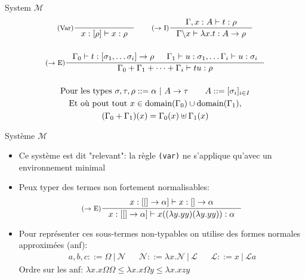 \documentclass{beamer}
\begin{document}
    \begin{frame}
    \begin{block}{System $\mathcal{M}$}
        \begin{gather*}
                \inference[(Var)]{}{x : [\rho] \vdash x : \rho}
                \qquad
                \inference[($\rightarrow$ I)]{\Gamma, x : A \vdash t : \rho}{\Gamma \backslash x \vdash \lambda x.t : A \rightarrow \rho}
                \\ \\
                \inference[($\rightarrow$ E)]{\Gamma_0 \vdash t : [\sigma_1, \ldots \sigma_i] \rightarrow \rho 
                    & \Gamma_1 \vdash u : \sigma_1, \ldots \Gamma_i \vdash u : \sigma_i}
                {\Gamma_0 + \Gamma_1 + \cdots + \Gamma_i \vdash tu : \rho}
                \\ \\
                \text{Pour les types } \sigma, \tau, \rho ::= \alpha \ | \ A \rightarrow \tau \qquad A ::= [\sigma_i]_{i \in I}
                \\ \text{Et où pout tout } x \in \text{domain}(\Gamma_0)\cup\text{domain}(\Gamma_1) ,
                 \\  (\Gamma_0 + \Gamma_1)(x) = \Gamma_0(x) \uplus\Gamma_1(x) 
        \end{gather*}
    \end{block}
    \end{frame}
    
    \begin{frame}{Système $\mathcal{M}$}
    \begin{itemize}
    \item Ce système est dit "relevant": la règle \texttt{(var)} ne s'applique qu'avec un environnement minimal
    \item Peux typer des termes non fortement normalisables:
        \begin{displaymath}
            \inference[($\rightarrow$ E)]{x:[[] \rightarrow \alpha] \vdash x : [] \rightarrow \alpha}{x : [[] \rightarrow \alpha] \vdash x((\lambda y.yy)(\lambda y.yy)) : \alpha}
        \end{displaymath}
    \item Pour représenter ces sous-termes non-typables on utilise des formes normales approximées (anf):
    \begin{align*}
        a,b,c ::= \Omega\ |\ \mathcal{N} 
        && \mathcal{N} ::= \lambda x.\mathcal{N}\ |\ \mathcal{L}
        && \mathcal{L} ::= x\ |\ \mathcal{L}a
    \end{align*}
            Ordre sur les anf: $\lambda x.x\Omega\Omega \leq \lambda x.x\Omega y \leq \lambda x.xzy$
    \end{itemize}
    \end{frame}
    
\end{document}
